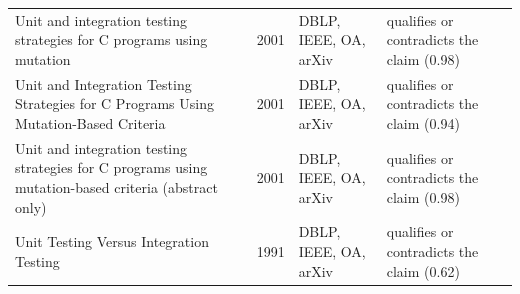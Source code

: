 \begin{longtable}{@{}%
  >{\raggedright\arraybackslash}p{}c%
  >{\raggedright\arraybackslash}p{}%
  >{\raggedright\arraybackslash}p{}@{}}
Unit and integration testing strategies for C programs using mutation & 2001 & DBLP, IEEE, OA, arXiv & qualifies or contradicts the claim (0.98) \\
Unit and Integration Testing Strategies for C Programs Using Mutation-Based Criteria & 2001 & DBLP, IEEE, OA, arXiv & qualifies or contradicts the claim (0.94) \\
Unit and integration testing strategies for C programs using mutation-based criteria (abstract only) & 2001 & DBLP, IEEE, OA, arXiv & qualifies or contradicts the claim (0.98) \\
Unit Testing Versus Integration Testing & 1991 & DBLP, IEEE, OA, arXiv & qualifies or contradicts the claim (0.62) \\
\end{longtable}
\endgroup
